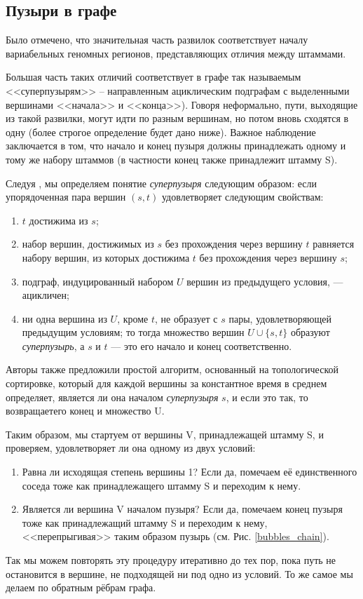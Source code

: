 \documentclass{spbau-diploma}
\begin{document}
\subsection{Пузыри в графе}

Было отмечено, что значительная часть развилок соответствует началу вариабельных геномных регионов, представляющих отличия между штаммами.

Большая часть таких отличий соответствует в графе так называемым <<суперпузырям>> -- направленным ациклическим подграфам с выделенными вершинами <<начала>> и <<конца>>). Говоря неформально, пути, выходящие из такой развилки, могут идти по разным вершинам, но потом вновь сходятся в одну (более строгое определение будет дано ниже). Важное наблюдение заключается в том, что начало и конец пузыря должны принадлежать одному и тому же набору штаммов (в частности конец также принадлежит штамму S). 

Следуя \cite{superbubbles}, мы определяем понятие \textit{суперпузыря} следующим образом: если упорядоченная пара вершин $(s,t)$ удовлетворяет следующим свойствам:
\begin{enumerate}
    \item $t$ достижима из $s$;
    \item набор вершин, достижимых из $s$ без прохождения через вершину $t$ равняется набору вершин, из которых достижима $t$ без прохождения через вершину $s$;
    \item подграф, индуцированный набором $U$ вершин из предыдущего условия, --- ацикличен;
    \item ни одна вершина из $U$, кроме $t$, не образует с $s$ пары, удовлетворяющей предыдущим условиям; то тогда множество вершин $U \cup \{s,t\}$ образуют \textit{суперпузырь}, а $s$ и $t$ --- это его начало и конец соответственно. 
\end{enumerate}

Авторы \cite{superbubbles} также предложили простой алгоритм, основанный на топологической сортировке, который для каждой вершины за константное время в среднем определяет, является ли она началом \textit{суперпузыря} $s$, и если это так, то возвращаетего конец и множество U.

Таким образом, мы стартуем от вершины V, принадлежащей штамму S, и проверяем, удовлетворяет ли она одному из двух условий:
\begin{enumerate}
    \item Равна ли исходящая степень вершины 1? Если да, помечаем её единственного соседа тоже как принадлежащего штамму S и переходим к нему.
    \item Является ли вершина V началом пузыря? Если да, помечаем конец пузыря тоже как принадлежащий штамму S и переходим к нему, <<перепрыгивая>> таким образом пузырь (см. Рис. \ref{bubbles_chain}). 
\end{enumerate}
Так мы можем повторять эту процедуру итеративно до тех пор, пока путь не остановится в вершине, не подходящей ни под одно из условий. То же самое мы делаем по обратным рёбрам графа.
\end{document}
